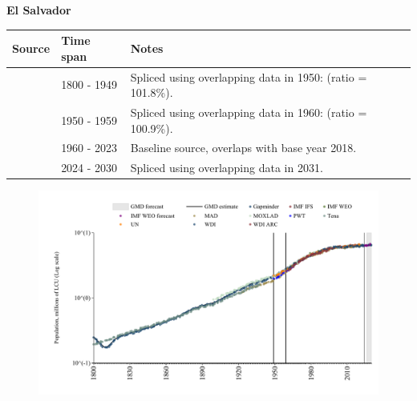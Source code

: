 \documentclass[12pt,a4paper,landscape]{article}
\begin{document}
\begin{adjustbox}{max totalsize={\paperwidth}{\paperheight},center}
\begin{minipage}[t][\textheight][t]{\textwidth}
\vspace*{0.5cm}
{}
\begin{center}
{\Large\bfseries El Salvador}
\end{center}
\vspace{0.5cm}
\begin{table}[H]
\centering
\small
\begin{tabular}{|l|l|l|}
\hline
\textbf{Source} & \textbf{Time span} & \textbf{Notes} \\
\hline
\rowcolor{white}\cite{Gapminder}& 1800 - 1949 &Spliced using overlapping data in 1950: (ratio = 101.8\%).\\
\rowcolor{lightgray}\cite{IMF_IFS}& 1950 - 1959 &Spliced using overlapping data in 1960: (ratio = 100.9\%).\\
\rowcolor{white}\cite{WDI}& 1960 - 2023 &Baseline source, overlaps with base year 2018.\\
\rowcolor{lightgray}\cite{Gapminder}& 2024 - 2030 &Spliced using overlapping data in 2031.\\
\hline
\end{tabular}
\end{table}
\begin{figure}[H]
\centering
\includegraphics[width=\textwidth,height=0.6\textheight,keepaspectratio]{graphs/SLV_pop.pdf}
\end{figure}
\end{minipage}
\end{adjustbox}
\end{document}

